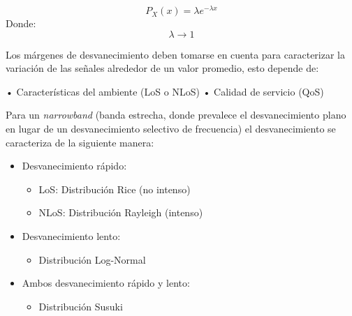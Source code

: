\begin{equation}
    P_{X}(x)=\lambda e^{-\lambda x}
    \label{eqn:Exponeqn}
\end{equation}
Donde:
\[\lambda\to 1\] 

Los márgenes de desvanecimiento deben tomarse en cuenta para caracterizar la variación de las señales alrededor de un valor promedio, esto depende de:\newline

•	Características del ambiente (LoS o NLoS)\newline
•	Calidad de servicio (QoS)\newline

Para un \textit{narrowband} (banda estrecha, donde prevalece el desvanecimiento plano en lugar de un desvanecimiento selectivo de frecuencia) el desvanecimiento se caracteriza de la siguiente manera:
\begin{itemize}
    \item Desvanecimiento rápido:
    \begin{itemize}
        \item LoS: Distribución Rice (no intenso)
        \item NLoS: Distribución Rayleigh (intenso)
    \end{itemize}
    \item Desvanecimiento lento:
    \begin{itemize}
        \item Distribución Log-Normal
    \end{itemize}
    \item Ambos desvanecimiento rápido y lento:
    \begin{itemize}
        \item Distribución Susuki
    \end{itemize}
\end{itemize}

